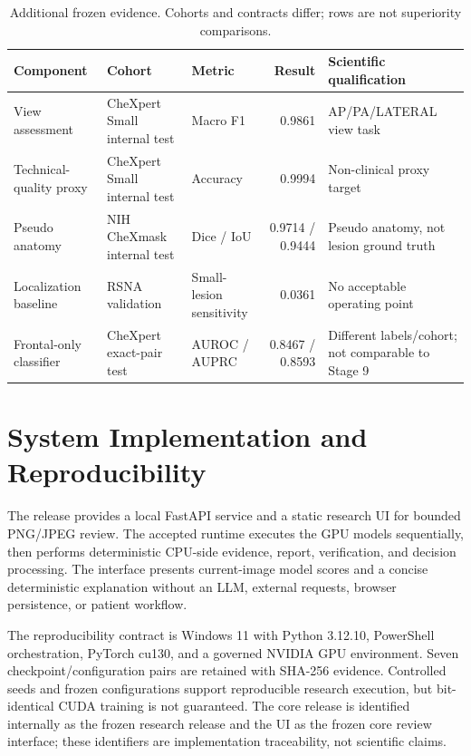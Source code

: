 \documentclass[10pt,a4paper,twocolumn]{article}
\begin{document}
\begin{table}[t]
\centering\small
\caption{Additional frozen evidence. Cohorts and contracts differ; rows are not superiority comparisons.}
\label{tab:additional}
\begin{tabularx}{\textwidth}{@{}l l l r Y@{}}
\toprule
\textbf{Component} & \textbf{Cohort} & \textbf{Metric} & \textbf{Result} & \textbf{Scientific qualification}\\
\midrule
View assessment & CheXpert Small internal test & Macro F1 & 0.9861 & AP/PA/LATERAL view task\\
Technical-quality proxy & CheXpert Small internal test & Accuracy & 0.9994 & Non-clinical proxy target\\
Pseudo anatomy & NIH CheXmask internal test & Dice / IoU & 0.9714 / 0.9444 & Pseudo anatomy, not lesion ground truth\\
Localization baseline & RSNA validation & Small-lesion sensitivity & 0.0361 & No acceptable operating point\\
Frontal-only classifier & CheXpert exact-pair test & AUROC / AUPRC & 0.8467 / 0.8593 & Different labels/cohort; not comparable to Stage 9\\
\bottomrule
\end{tabularx}
\end{table}

\section{System Implementation and Reproducibility}
The release provides a local FastAPI service and a static research UI for bounded PNG/JPEG review. The accepted runtime executes the GPU models sequentially, then performs deterministic CPU-side evidence, report, verification, and decision processing. The interface presents current-image model scores and a concise deterministic explanation without an LLM, external requests, browser persistence, or patient workflow.

The reproducibility contract is Windows 11 with Python 3.12.10, PowerShell orchestration, PyTorch cu130, and a governed NVIDIA GPU environment. Seven checkpoint/configuration pairs are retained with SHA-256 evidence. Controlled seeds and frozen configurations support reproducible research execution, but bit-identical CUDA training is not guaranteed. The core release is identified internally as the frozen research release and the UI as the frozen core review interface; these identifiers are implementation traceability, not scientific claims.
\end{document}
